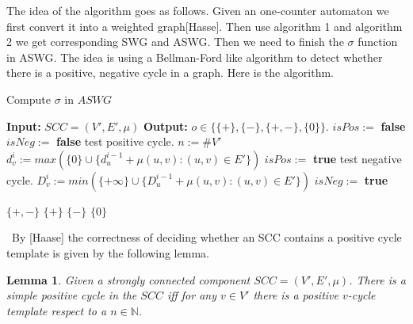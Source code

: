 \documentclass{article}
\newtheorem{lemma}{Lemma}
\begin{document}
The idea of the algorithm goes as follows. Given an one-counter automaton we first convert it into a weighted graph[Hasse]. Then use algorithm 1 and algorithm 2 we get corresponding SWG and ASWG. Then we need to finish the $\sigma$ function in ASWG. The idea is using a Bellman-Ford like algorithm to detect whether there is a positive, negative cycle in a graph. Here is the algorithm.

\begin{algorithm}
	\caption{Compute $\sigma$ in $ASWG$}

	\begin{algorithmic}
	\State {}
		\State \textbf{Input: } $SCC = (V', E', \mu)$
		\State \textbf{Output: } $o \in \{\{+\}, \{-\}, \{+,-\}, \{0\}\}$.
		\State $isPos := $ \textbf{false}
		\State $isNeg := $ \textbf{false}
		\State \Comment test positive cycle.
		\State $n := \#V'$
				\State$d_v^i := max(\{0\}\cup \{d_u^{i-1} + \mu(u,v) : (u,v)\in E' \})$
			\EndFor
		\EndFor
			\State $isPos :=$ \textbf{true}
		\EndIf
		\State \Comment test negative cycle.
				\State$D_v^i := min(\{+\infty\}\cup \{D_u^{i-1} + \mu(u,v) : (u,v)\in E' \})$
			\EndFor
		\EndFor
			\State $isNeg :=$ \textbf{true}
		\EndIf
		
		\State
			\State\Return $\{+,-\}$
			\State\Return $\{+\}$
			\State\Return $\{-\}$
		\Else
			\State\Return $\{0\}$
		\EndIf
	\EndFunction
	\end{algorithmic}

\end{algorithm}


\
By [Haase] the correctness of deciding whether an SCC contains a positive cycle template is given by the following lemma.


\begin{lemma}
Given a strongly connected component $SCC = (V', E', \mu)$. There is a simple positive cycle in the $SCC$ iff for any $v\in V'$ there is a positive $v$-cycle template respect to a $n\in \mathbb{N}$.


\end{lemma}
\end{document}
